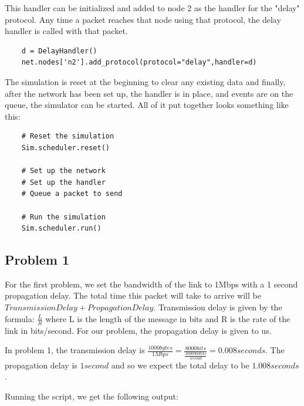 \documentclass[11pt]{article}
\begin{document}
This handler can be initialized and added to node 2 as the handler for the "delay" protocol. Any time a packet reaches that node using that protocol, the delay handler is called with that packet.

\vspace{5mm}

\begin{lstlisting}
    d = DelayHandler()
    net.nodes['n2'].add_protocol(protocol="delay",handler=d)
\end{lstlisting}

\vspace{5mm}

The simulation is reset at the beginning to clear any existing data and finally, after the network has been set up, the handler is in place, and events are on the queue, the simulator can be started. All of it put together looks something like this:

\vspace{5mm}

\begin{lstlisting}
    # Reset the simulation
    Sim.scheduler.reset()

    # Set up the network
    # Set up the handler
    # Queue a packet to send

    # Run the simulation
    Sim.scheduler.run()
\end{lstlisting}

\vspace{5mm}

\subsection{Problem 1}

For the first problem, we set the bandwidth of the link to 1Mbps with a 1 second propagation delay. The total time this packet will take to arrive will be \(Transmission Delay + Propagation Delay\). Transmission delay is given by the formula: \(\frac{L}{R}\) where L is the length of the message in bits and R is the rate of the link in bits/second. For our problem, the propagation delay is given to us.

In problem 1, the transmission delay is \(\frac{1000bytes}{1Mbps} = \frac{8000bits}{\frac{1000000bits}{second}} = 0.008 seconds\). The propagation delay is \(1 second\) and so we expect the total delay to be \(1.008 seconds\).

Running the script, we get the following output:

\vspace{5mm}
\end{document}
